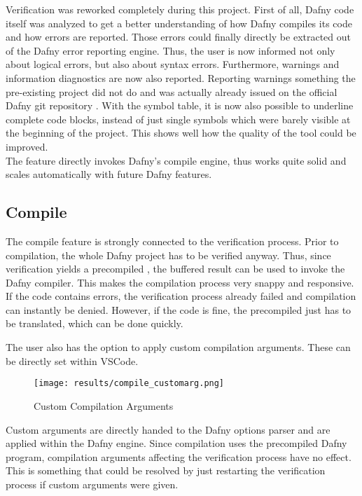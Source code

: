 Verification was reworked completely during this project.
First of all, Dafny code itself was analyzed to get a better understanding of how Dafny compiles its code and how errors are reported.
Those errors could finally directly be extracted out of the Dafny error reporting engine.
Thus, the user is now informed not only about logical errors, but also about syntax errors.
Furthermore, warnings and information diagnostics are now also reported.
Reporting warnings something the pre-existing project did not do and was actually already issued on the official Dafny git repository \cite{dafny_noWarnings}.
With the symbol table, it is now also possible to underline complete code blocks, instead of just single symbols which were barely visible at the beginning of the project.
This shows well how the quality of the tool could be improved.\\

The feature directly invokes Dafny's compile engine, thus works quite solid and scales automatically with future Dafny features.


\subsection{Compile}
The compile feature is strongly connected to the verification process.
Prior to compilation, the whole Dafny project has to be verified anyway.
Thus, since verification yields a precompiled , the buffered result can be used to invoke the Dafny compiler.
This makes the compilation process very snappy and responsive.\\

If the code contains errors, the verification process already failed and compilation can instantly be denied.
However, if the code is fine, the precompiled  just has to be translated, which can be done quickly.

The user also has the option to apply custom compilation arguments.
These can be directly set within VSCode.
\begin{figure}[H]
    \centering
    \texttt{[image: results/compile\_customarg.png]}
    \caption{Custom Compilation Arguments}
    \label{fig:compilation_custom_args}
\end{figure}

Custom arguments are directly handed to the Dafny options parser and are applied within the Dafny engine.
Since compilation uses the precompiled Dafny program, compilation arguments affecting the verification process have no effect.
This is something that could be resolved by just restarting the verification process if custom arguments were given.\\

